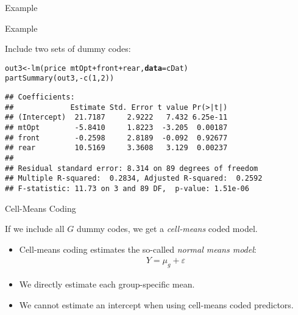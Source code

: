 \documentclass{beamer}\usepackage[]{graphicx}\usepackage[]{color}
\makeatletter
\newcommand{\hlnum}[1]{\textcolor[rgb]{0.69,0.494,0}{#1}}%
\newcommand{\hlopt}[1]{\textcolor[rgb]{0,0,0}{#1}}%
\newcommand{\hlstd}[1]{\textcolor[rgb]{0,0,0}{#1}}%
\newcommand{\hlkwb}[1]{\textcolor[rgb]{0,0.341,0.682}{#1}}%
\newcommand{\hlkwc}[1]{\textcolor[rgb]{0,0,0}{\textbf{#1}}}%
\newcommand{\hlkwd}[1]{\textcolor[rgb]{0.004,0.004,0.506}{#1}}%
\newenvironment{kframe}{%
 \def\at@end@of@kframe{}%
 \ifinner\ifhmode%
  \def\at@end@of@kframe{\end{minipage}}%
  \begin{minipage}{\columnwidth}%
 \fi\fi%
 \def\FrameCommand##1{\hskip\@totalleftmargin \hskip-\fboxsep
 \colorbox{shadecolor}{##1}\hskip-\fboxsep
     \hskip-\linewidth \hskip-\@totalleftmargin \hskip\columnwidth}%
 \MakeFramed {\advance\hsize-\width
   \@totalleftmargin\z@ \linewidth\hsize
   \@setminipage}}%
 {\par\unskip\endMakeFramed%
 \at@end@of@kframe}
\newenvironment{knitrout}{}{} %
\makeatother
\begin{document}
\begin{frame}{Example}
\end{frame}


\begin{frame}[fragile]{Example}
  
  Include two sets of dummy codes:
  
\begin{knitrout}\footnotesize
{}\color{fgcolor}\begin{kframe}
\begin{alltt}
\hlstd{out3} \hlkwb{<-} \hlkwd{lm}\hlstd{(price} \hlopt{~} \hlstd{mtOpt} \hlopt{+} \hlstd{front} \hlopt{+} \hlstd{rear,} \hlkwc{data} \hlstd{= cDat)}
\hlkwd{partSummary}\hlstd{(out3,} \hlopt{-}\hlkwd{c}\hlstd{(}\hlnum{1}\hlstd{,} \hlnum{2}\hlstd{))}
\end{alltt}
\begin{verbatim}
## Coefficients:
##             Estimate Std. Error t value Pr(>|t|)
## (Intercept)  21.7187     2.9222   7.432 6.25e-11
## mtOpt        -5.8410     1.8223  -3.205  0.00187
## front        -0.2598     2.8189  -0.092  0.92677
## rear         10.5169     3.3608   3.129  0.00237
## 
## Residual standard error: 8.314 on 89 degrees of freedom
## Multiple R-squared:  0.2834,	Adjusted R-squared:  0.2592 
## F-statistic: 11.73 on 3 and 89 DF,  p-value: 1.51e-06
\end{verbatim}
\end{kframe}
\end{knitrout}

\end{frame}

\watermarkon %

\begin{frame}{Cell-Means Coding}
  
  If we include all $G$ dummy codes, we get a \emph{cell-means} coded model.
  \begin{itemize}
  \item Cell-means coding estimates the so-called \emph{normal means model}:
    \begin{align*}
      Y = \mu_g + \varepsilon
    \end{align*}
  \item We directly estimate each group-specific mean.
    \vc
  \item We cannot estimate an intercept when using cell-means coded predictors.
  \end{itemize}
  
\end{frame}
\end{document}
